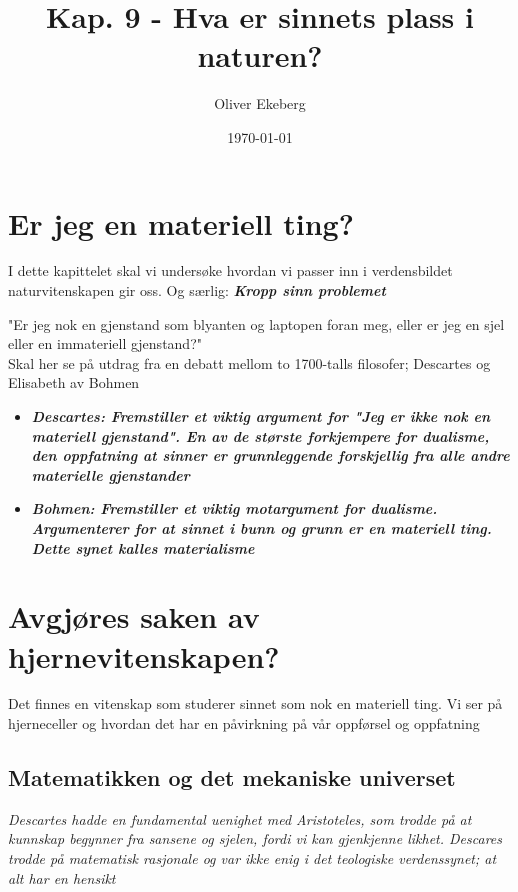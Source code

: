 \documentclass[11pt, a4paper]{article}
\title{Kap. 9 - Hva er sinnets plass i naturen?}
\author{Oliver Ekeberg}
\date{\today}
\begin{document}
\maketitle

\tableofcontents


\section{Er jeg en materiell ting?}

I dette kapittelet skal vi undersøke hvordan vi passer inn i verdensbildet naturvitenskapen gir oss. Og særlig: \textbf{\textit{Kropp sinn problemet}}


"Er jeg nok en gjenstand som blyanten og laptopen foran meg, eller er jeg en sjel eller en immateriell gjenstand?"\\

Skal her se på utdrag fra en debatt mellom to 1700-talls filosofer; Descartes og Elisabeth av Bohmen


\begin{itemize}
    \item \textbf{\textit{Descartes: Fremstiller et viktig argument for "Jeg er ikke nok en materiell gjenstand". En av de største forkjempere for dualisme, den oppfatning at sinner er grunnleggende forskjellig fra alle andre materielle gjenstander}}
    \item \textbf{\textit{Bohmen: Fremstiller et viktig motargument for dualisme. Argumenterer for at sinnet i bunn og grunn er en materiell ting. Dette synet kalles materialisme}}
\end{itemize}


\section{Avgjøres saken av hjernevitenskapen?}


Det finnes en vitenskap som studerer sinnet som nok en materiell ting. Vi ser på hjerneceller og hvordan det har en påvirkning på vår oppførsel og oppfatning

\subsection{Matematikken og det mekaniske universet}

\textit{Descartes hadde en fundamental uenighet med Aristoteles, som trodde på at kunnskap begynner fra sansene og sjelen, fordi vi kan gjenkjenne likhet. Descares trodde på matematisk rasjonale og var ikke enig i det teologiske verdenssynet; at alt har en hensikt} \\
\end{document}
